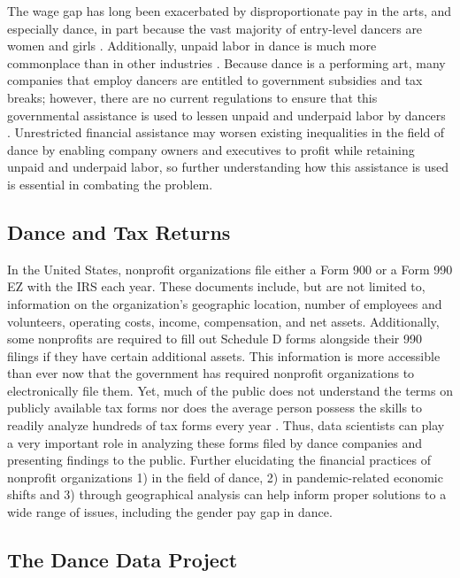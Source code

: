 \documentclass[Dance Data
Project,article,submit,moreauthors,pdftex]{mdpi}
\begin{document}
The wage gap has long been exacerbated by disproportionate pay in the
arts, and especially dance, in part because the vast majority of
entry-level dancers are women and girls \citep{jikar_gender_2022}.
Additionally, unpaid labor in dance is much more commonplace than in
other industries \citep{noauthor_handbook_2013}. Because dance is a
performing art, many companies that employ dancers are entitled to
government subsidies and tax breaks; however, there are no current
regulations to ensure that this governmental assistance is used to
lessen unpaid and underpaid labor by dancers \citep{fuchs_where_2021}.
Unrestricted financial assistance may worsen existing inequalities in
the field of dance by enabling company owners and executives to profit
while retaining unpaid and underpaid labor, so further understanding how
this assistance is used is essential in combating the problem.

\hypertarget{dance-and-tax-returns}{%
\subsection{Dance and Tax Returns}\label{dance-and-tax-returns}}

In the United States, nonprofit organizations file either a Form 900 or
a Form 990 EZ with the IRS each year. These documents include, but are
not limited to, information on the organization's geographic location,
number of employees and volunteers, operating costs, income,
compensation, and net assets. Additionally, some nonprofits are required
to fill out Schedule D forms alongside their 990 filings if they have
certain additional assets. This information is more accessible than ever
now that the government has required nonprofit organizations to
electronically file them. Yet, much of the public does not understand
the terms on publicly available tax forms nor does the average person
possess the skills to readily analyze hundreds of tax forms every year
\citep{lamothe_examining_2023}. Thus, data scientists can play a very
important role in analyzing these forms filed by dance companies and
presenting findings to the public. Further elucidating the financial
practices of nonprofit organizations 1) in the field of dance, 2) in
pandemic-related economic shifts and 3) through geographical analysis
can help inform proper solutions to a wide range of issues, including
the gender pay gap in dance.

\hypertarget{the-dance-data-project}{%
\subsection{The Dance Data Project}\label{the-dance-data-project}}
\end{document}

